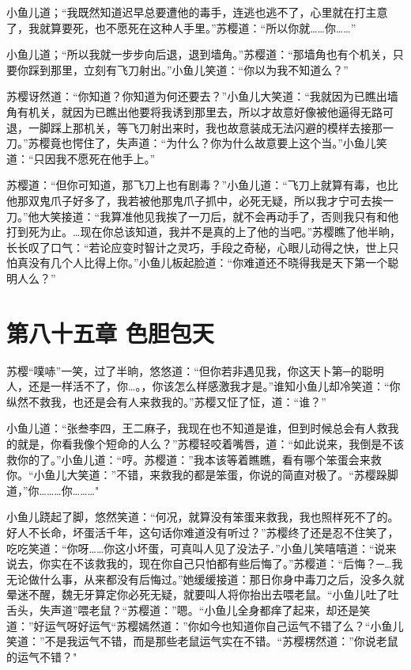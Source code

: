 \documentclass[12pt,oneside]{book}
\begin{document}
小鱼儿道；``我既然知道迟早总要遭他的毒手，连逃也逃不了，心里就在打主意了，我就算要死，也不愿死在这种人手里。''苏樱道：``所以你就\ldots\ldots 你\ldots\ldots{}''

小鱼儿道；``所以我就一步步向后退，退到墙角。''苏樱道：``那墙角也有个机关，只要你踩到那里，立刻有飞刀射出。''小鱼儿笑道：``你以为我不知道么？''

苏樱讶然道：``你知道？你知道为何还要去？''小鱼儿大笑道：``我就因为已瞧出墙角有机关，就因为已瞧出他要将我诱到那里去，所以才故意好像被他逼得无路可退，一脚踩上那机关，等飞刀射出来时，我也故意装成无法闪避的模样去接那一刀。''苏樱竟也愕住了，失声道：``为什么？你为什么故意要上这个当。''小鱼儿笑道：``只因我不愿死在他手上。''

苏樱道：``但你可知道，那飞刀上也有剧毒？''小鱼儿道：``飞刀上就算有毒，也比他那双鬼爪子好多了，我若被他那鬼爪子抓中，必死无疑，所以我才宁可去挨一刀。''他大笑接道：``我算准他见我挨了一刀后，就不会再动手了，否则我只有和他打到死为止。\ldots 现在你总该知道，我并不是真的上了他的当吧。''苏樱瞧了他半晌，长长叹了口气：``若论应变时智计之灵巧，手段之奇秘，心眼儿动得之快，世上只怕真没有几个人比得上你。''小鱼儿板起脸道：``你难道还不晓得我是天下第一个聪明人么？''

\hypertarget{ux7b2cux516bux5341ux4e94ux7ae0-ux8272ux80c6ux5305ux5929}{%
\chapter{第八十五章
色胆包天}\label{ux7b2cux516bux5341ux4e94ux7ae0-ux8272ux80c6ux5305ux5929}}

苏樱``噗哧''一笑，过了半晌，悠悠道：``但你若非遇见我，你这天卜第─的聪明人，还是一样活不了，你\ldots。，你该怎么样感激我才是。''谁知小鱼儿却冷笑道：``你纵然不救我，也还是会有人来救我的。''苏樱又怔了怔，道：``谁？''

小鱼儿道：``张叁李四，王二麻子，我现在也不知道是谁，但到时候总会有人救我的就是，你看我像个短命的人么？''苏樱轻咬着嘴唇，道：``如此说来，我倒是不该救你的了。''小鱼儿道：``哼。苏樱道：''我本该等着瞧瞧，看有哪个笨蛋会来救你。``小鱼儿大笑道：''不错，来救我的都是笨蛋，你说的简直对极了。``苏樱跺脚道，''你\ldots\ldots\ldots 你\ldots\ldots\ldots"

小鱼儿跷起了脚，悠然笑道：``何况，就算没有笨蛋来救我，我也照样死不了的。好人不长命，坏蛋活千年，这句话你难道没有听过？''苏樱终了还是忍不住笑了，吃吃笑道：``你呀\ldots\ldots 你这小坏蛋，可真叫人见了没法子．''小鱼儿笑嘻嘻道：``说来说去，你实在不该救我的，现在你自己只怕都有些后悔了。''苏樱道：``后悔？─\ldots 我无论做什么事，从来都没有后悔过。''她缓缓接道：那日你身中毒刀之后，没多久就晕迷不醒，魏无牙算定你必死无疑，就要叫人将你抬出去喂老鼠。``小鱼儿吐了吐舌头，失声道''喂老鼠？``苏樱道：''嗯。``小鱼儿全身都痒了起来，却还是笑道：''好运气呀好运气``苏樱嫣然道：''你如今也知道你自己运气不错了么？``小鱼儿笑道：''不是我运气不错，而是那些老鼠运气实在不错。``苏樱楞然道：''你说老鼠的运气不错？"
\end{document}
